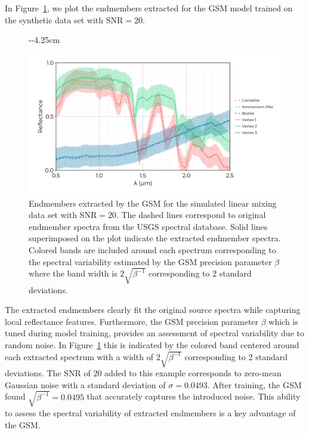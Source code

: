 \documentclass[remotesensing,article,submit,pdftex,moreauthors]{Definitions/mdpi}
\begin{document}
In Figure~\ref{fig:usgs-endmembers}, we plot the endmembers extracted for the GSM model trained on the synthetic data set with $\text{SNR}=20$.
\begin{figure}[H]
\begin{adjustwidth}{-\extralength}{-4.25cm}
\begin{center}
\includegraphics[width=1.1\columnwidth]{results/usgs/extracted-endmembers.png}
\end{center}
\end{adjustwidth}
\caption{Endmembers extracted by the GSM for the simulated linear mixing data set with SNR$=20$. The dashed lines correspond to original endmember spectra from the USGS spectral database. Solid lines superimposed on the plot indicate the extracted endmember spectra. Colored bands are included around each spectrum corresponding to the spectral variability estimated by the GSM precision parameter $\beta$ where the band width is $2\sqrt{\beta^{-1}}$ corresponding to $2$ standard deviations.}
\label{fig:usgs-endmembers}
\end{figure}  
The extracted endmembers clearly fit the original source spectra while capturing local reflectance features. Furthermore, the GSM precision parameter $\beta$ which is tuned during model training, provides an assessment of spectral variability due to random noise. In Figure~\ref{fig:usgs-endmembers} this is indicated by the colored band centered around each extracted spectrum with a width of $2\sqrt{\beta^{-1}}$ corresponding to 2 standard deviations. The SNR of $20$ added to this example corresponds to zero-mean Gaussian noise with a standard deviation of $\sigma=0.0493$. After training, the GSM found $\sqrt{\beta^{-1}}=0.0495$ that accurately captures the introduced noise. This ability to assess the spectral variability of extracted endmembers is a key advantage of the GSM.
\end{document}
